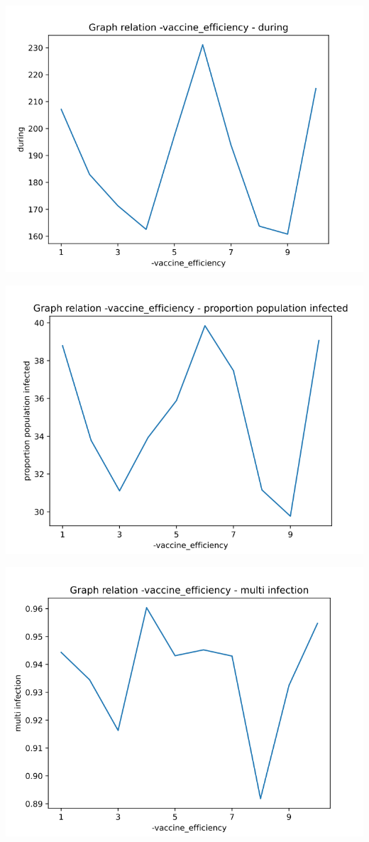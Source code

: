 \documentclass[a4paper, 11pt]{article}
\begin{document}
				
				\includegraphics[scale=0.45]{attachements/vaccine_efficiency_during.png}
				
				\includegraphics[scale=0.45]{attachements/vaccine_efficiency_proportion.png}
				
				\includegraphics[scale=0.45]{attachements/vaccine_efficiency_multi_infection.png}
\end{document}
